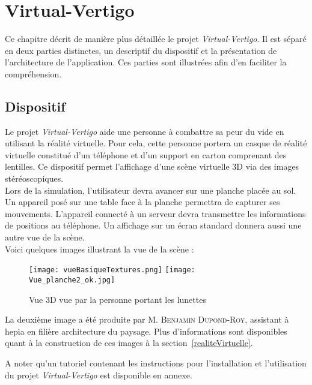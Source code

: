 \chapter{Virtual-Vertigo} \label{vertigo}
Ce chapitre décrit de manière plus détaillée le projet \textit{Virtual-Vertigo}. Il est séparé en deux parties distinctes, un descriptif du dispositif et la présentation de  l'architecture de l'application. Ces parties sont illustrées afin d'en faciliter la compréhension.


\section{Dispositif} \label{dispositif}

Le projet \textit{Virtual-Vertigo} aide une personne à combattre sa peur du vide en utilisant la réalité virtuelle. Pour cela, cette personne portera un casque de réalité virtuelle constitué d'un téléphone et d'un support en carton comprenant des lentilles. Ce dispositif permet l'affichage d'une scène virtuelle 3D via des images stéréoscopiques. \\
Lors de la simulation, l'utilisateur devra avancer sur une planche placée au sol. Un appareil posé sur une table face à la planche permettra de capturer ses mouvements. L'appareil connecté à un serveur devra transmettre les informations de positions au téléphone. Un affichage sur un écran standard donnera aussi une autre vue de la scène.\\

Voici quelques images illustrant la vue de la scène :
\begin{figure}[H]
   \texttt{[image: vueBasiqueTextures.png]}
   \texttt{[image: Vue\_planche2\_ok.jpg]}
   \caption{\label{vue} Vue 3D vue par la personne portant les lunettes}
\end{figure}

La deuxième image a été produite par \textsc{M. Benjamin Dupond-Roy}, assistant à hepia en filière architecture du paysage. Plus d'informations sont disponibles quant à la construction de ces images à la section~\ref{realiteVirtuelle}.

A noter qu'un tutoriel contenant les instructions pour l'installation et l'utilisation du projet \textit{Virtual-Vertigo} est disponible en annexe.


